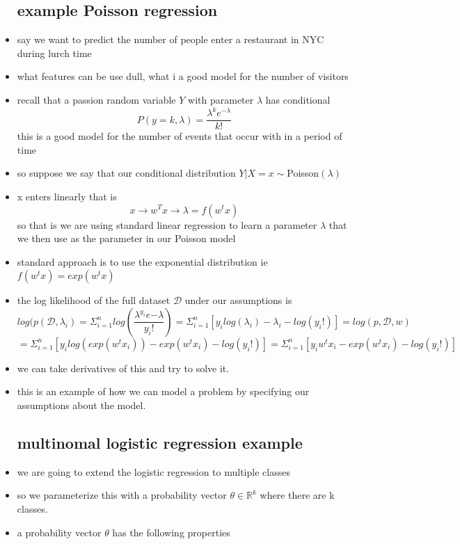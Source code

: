 \documentclass{article}
\begin{document}
\begin{itemize}
\subsection{example Poisson regression}
\item say we want to predict the number of people enter a restaurant in NYC during lurch time 
\item what features can be use dull, what i a good model for the number of visitors
\item recall that a passion random variable $Y$ with parameter $\lambda$ has conditional $$P(y=k,\lambda)=\frac{\lambda^ke^{-\lambda}}{k!}$$ this is a good model for the number of events that occur with in a period of time 
\item so suppose we say that our conditional distribution $Y|X=x\sim$Poisson$(\lambda)$
\item x enters linearly that is $$x\rightarrow w^Tx\rightarrow \lambda=f(w^tx)$$ so that is we are using standard linear regression to learn a parameter $\lambda$ that we then use as the parameter in our Poisson model 
\item standard approach is to use the exponential distribution ie $f(w^tx)=exp(w^tx)$
\item the log likelihood of the full dataset $\mathcal{D}$ under our assumptions is 
$$log(p(\mathcal{D},\lambda _i)=\Sigma_{i=1}^{n}log(\frac{\lambda^{y_i}e{-\lambda}}{y_i!})=\Sigma_{i=1}^{n}[y_ilog(\lambda_i)-\lambda_i-log(y_i!)]=log(p,\mathcal{D},w)$$ $$=\Sigma_{i=1}^{n}[y_ilog(exp(w^tx_i))-exp(w^tx_i)-log(y_i!)]=\Sigma_{i=1}^{n}[y_iw^tx_i-exp(w^tx_i)-log(y_i!)]$$
\item we can take derivatives of this and try to solve it. 
\item this is an example of how we can model a problem by specifying our assumptions about the model. 
\subsection{multinomal logistic regression example}
\item we are going to extend the logistic regression to multiple classes
\item so we parameterize this with a probability vector $\theta\in \mathbb{R}^{k}$ where there are k classes.
\item a probability vector $\theta$ has the following properties
\begin{itemize}


\end{itemize}
\end{itemize}
\end{document}
